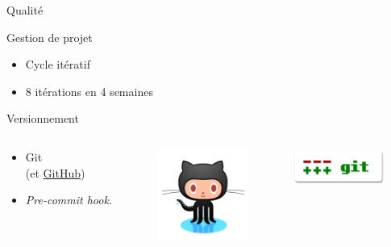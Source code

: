\documentclass[frenchb]{beamer}
\begin{document}
\begin{frame}{Qualité}
    \begin{block}{Gestion de projet}
        \begin{itemize}
            \item Cycle itératif
            \item 8 itérations en 4 semaines
        \end{itemize}
    \end{block}

    \begin{block}{Versionnement}
        \begin{columns}
            \begin{column}[l]{3cm}
                \begin{itemize}
                    \item Git \\(et \href{https://github.com/}{GitHub})
                    \item \emph{Pre-commit hook}.
                \end{itemize}
            \end{column}
            \begin{column}[c]{3cm}
                \begin{center}
                    \includegraphics[width=3cm]{../img/png/octocat.png}
                \end{center}
            \end{column}
            \begin{column}[r]{3cm}
                \begin{center}
                    \includegraphics[width=3cm]{../img/ps/Git-logo.pdf}
                \end{center}
            \end{column}
        \end{columns}
    \end{block}
\end{frame}
\end{document}
